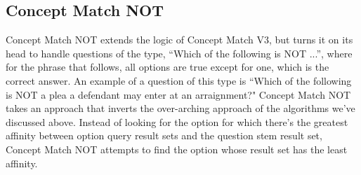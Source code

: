 \begin{table}[h!]
\centering
\caption{Concept Match V3 vs. V2 Hypothesis Test on Definition Questions}
\small
{}
\label{table:concept_match_v3_hypothesis_test}
\end{table}


\subsection{Concept Match NOT}

Concept Match NOT extends the logic of Concept Match V3, but turns it on its head to handle questions of the type, ``Which of the following is NOT ...'', where for the phrase that follows, all options are true except for one, which is the correct answer.  An example of a question of this type is ``Which of the following is NOT a plea a defendant may enter at an arraignment?" \cite{acfe_study_package_2011}
Concept Match NOT takes an approach that inverts the over-arching approach of the algorithms we've discussed above.  Instead of looking for the option for which there's the greatest affinity between option query result sets and the question stem result set, Concept Match NOT attempts to find the option whose result set has the least affinity.  

